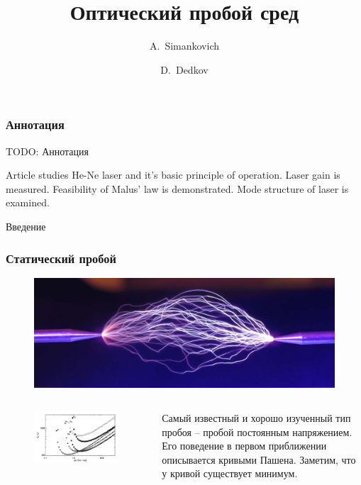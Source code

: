 \documentclass{beamer}
\title[About Beamer] %
{Оптический пробой сред}
\author[Arthur, Doe] %
{A.~Simankovich \and D.~Dedkov }
\institute[VFU] %
{
	Moscow Institute of Physics and Technology
}
\date[VLC 2023] %
\begin{document}
	
	\frame{\titlepage}
	
	\begin{frame}
		\frametitle{Аннотация}
		
		TODO: Аннотация
		
		Article studies He-Ne laser and it's basic principle of operation. Laser gain is measured. Feasibility of Malus' law is demonstrated. Mode structure of laser is examined.

	\end{frame}


	\begin{frame}[plain,c]
		
		\begin{center}
			\huge {} Введение
		\end{center}
	
	\end{frame}
	
	
	\begin{frame}
		\frametitle{Статический пробой}

		\begin{figure}
			\includegraphics[width=0.8\linewidth]{res/const_discharge.jpg}
		\end{figure}
		
		\begin{columns}
			\begin{figure}
				\includegraphics[width=\linewidth]{res/paschen.jpg}
			\end{figure}

			Самый известный и хорошо изученный тип пробоя -- пробой постоянным напряжением. Его поведение в первом приближении описывается кривыми Пашена.
			Заметим, что у кривой существует минимум.
		\end{columns}
		
		
	\end{frame}
\end{document}
